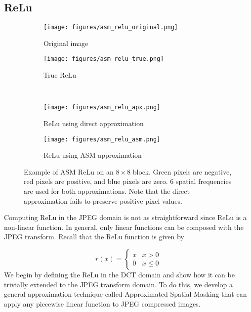 \documentclass[10pt,twocolumn,letterpaper]{article}
\begin{document}
\subsection{ReLu}\begin{figure}
    \centering
    \begin{subfigure}{0.20\textwidth}
        \captionsetup{width=.8\linewidth}
        \centering
        \texttt{[image: figures/asm\_relu\_original.png]}
        \caption{Original image}
    \end{subfigure}%
    \begin{subfigure}{0.2\textwidth}
        \captionsetup{width=.8\linewidth}
        \centering
        \texttt{[image: figures/asm\_relu\_true.png]}
        \caption{True ReLu}
    \end{subfigure}\\
    \begin{subfigure}{0.2\textwidth}
        \captionsetup{width=.8\linewidth}
        \centering
        \texttt{[image: figures/asm\_relu\_apx.png]}
        \caption{ReLu using direct approximation}
    \end{subfigure}%
    \begin{subfigure}{0.2\textwidth}
        \captionsetup{width=.8\linewidth}
        \centering
        \texttt{[image: figures/asm\_relu\_asm.png]}
        \caption{ReLu using ASM approximation}
    \end{subfigure}
    \caption{Example of ASM ReLu on an $8 \times 8$ block. Green pixels are negative, red pixels are positive, and blue pixels are zero. 6 spatial frequencies are used for both approximations. Note that the direct approximation fails to preserve positive pixel values.}
    \label{fig:asm}
\end{figure}

Computing ReLu in the JPEG domain is not as straightforward since ReLu is a non-linear function. In general, only linear functions can be composed with the JPEG transform. Recall that the ReLu function is given by 

\begin{equation}
    r(x) = \begin{cases}
    x & x > 0 \\
    0 & x \leq 0
    \end{cases}
\end{equation}
We begin by defining the ReLu in the DCT domain and show how it can be trivially extended to the JPEG transform domain. To do this, we develop a general approximation technique called Approximated Spatial Masking that can apply any piecewise linear function to JPEG compressed images.
\end{document}
